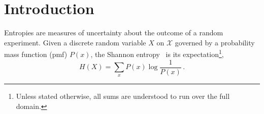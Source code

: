 \documentclass[aps,pra,11pt,onecolumn,nofootinbib,tightenlines]{revtex4-2}
\theoremstyle{definition}
\newcommand{\mc}[1]{\mathcal{#1}}
\begin{document}
\maketitle


\begingroup
\renewcommand{\thefootnote}{\fnsymbol{footnote}}

{} %
{}                         %

\endgroup

\tableofcontents 

\section{Introduction}

Entropies are measures of uncertainty about the outcome of a random experiment. Given a discrete random variable $X$ on $\mc{X}$ governed by a probability mass function (pmf) $P(x)$, the Shannon entropy~\cite{shannon1948mathematical} is its expectation\footnote{Unless stated otherwise, all sums are understood to run over the full domain.},
\begin{equation}
    H(X) = \sum_{x} P(x) \log \frac{1}{P(x)} \,.
\end{equation}
\end{document}

